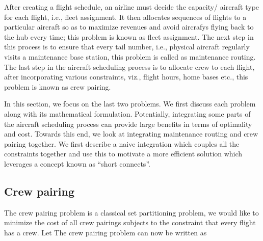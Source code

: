 \documentclass[letterpaper, 10pt, twocolumn, reqno]{amsart}
\begin{document}
After creating a flight schedule, an airline must decide the capacity/ aircraft type for each flight, i.e., fleet assignment. It then allocates sequences of flights to a particular aircraft so as to maximize revenues and avoid aircrafys flying back to the hub every time; this problem is known as fleet assignment. The next step in this process is to ensure that every tail number, i.e., physical aircraft regularly visits a maintenance base station, this problem is called as maintenance routing. The last step in the aircraft scheduling process is to allocate crew to each flight, after incorporating various constraints, viz., flight hours, home bases etc., this problem is known as crew pairing.

In this section, we focus on the last two problems. We first discuss each problem along with its mathematical formulation. Potentially, integrating some parts of the aircraft scheduling process can provide large benefits in terms of optimality and cost. Towards this end, we look at integrating maintenance routing and crew pairing together. We first describe a naive integration which couples all the constraints together and use this to motivate a more efficient solution which leverages a concept known as ``short connects''.

\subsection{Crew pairing}
\label{ssec:crew_pairing}

The crew pairing problem is a classical set partitioning problem, we would like to minimize the cost of all crew pairings subjects to the constraint that every flight has a crew. Let
The crew pairing problem can now be written as
\end{document}
